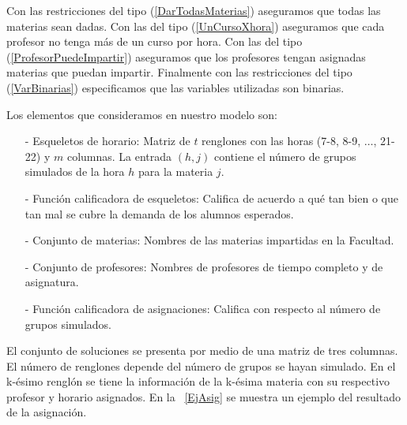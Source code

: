 Con las restricciones del tipo (\ref{DarTodasMaterias}) aseguramos que todas las materias sean dadas. Con las del tipo (\ref{UnCursoXhora}) aseguramos que cada profesor no tenga más de un curso por hora. Con las del tipo (\ref{ProfesorPuedeImpartir}) aseguramos que los profesores tengan asignadas materias que puedan impartir. Finalmente con las restricciones del tipo (\ref{VarBinarias}) especificamos que las variables utilizadas son binarias.



Los elementos que consideramos en nuestro modelo son:
  
\begin{itemize}
\item[-] Esqueletos de horario: Matriz de $t$ renglones con las horas (7-8, 8-9, $\ldots$, 21-22) y $m$ columnas. La entrada $(h,j)$ contiene el número de grupos simulados de la hora $h$ para la materia $j$.

\item[-] Función calificadora de esqueletos: Califica de acuerdo a qué tan bien o que tan mal se cubre la demanda de los alumnos esperados.

\item[-] Conjunto de materias: Nombres de las materias impartidas en la Facultad.

\item[-] Conjunto de profesores: Nombres de profesores de tiempo completo y de asignatura.

\item[-] Función calificadora de asignaciones: Califica con respecto al número de grupos simulados.
\end{itemize}

El conjunto de soluciones se presenta por medio de una matriz de tres columnas. El número de renglones depende del número de grupos se hayan simulado. En el k-ésimo renglón se tiene la información de la k-ésima materia con su respectivo profesor y horario asignados. En la \tablename{~\ref{EjAsig}} se muestra un ejemplo del resultado de la asignación.

